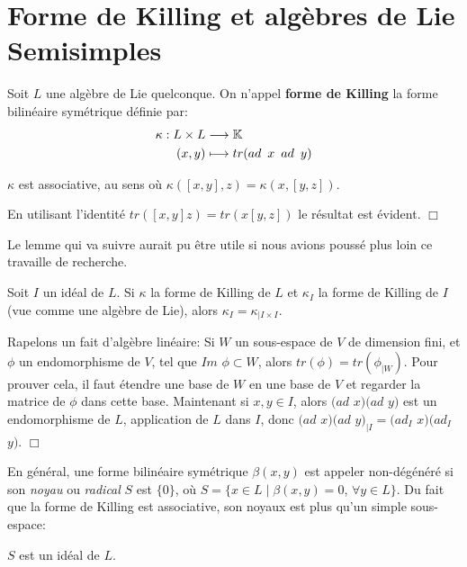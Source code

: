 \documentclass[a4paper,openany,12pt]{report}
\newcommand{\KK}{\mathbb{K}}
\theoremstyle{break}
{\theorembodyfont{\upshape}
\newtheorem*{rmq}{Remarque :}
\newtheorem*{prv}{Preuve :}
\newtheorem*{ex}{Exemples :}
\newtheorem*{exe}{Exemple : }
\newtheorem*{nota}{Notation :}
\newtheorem*{dem}{D\'emonstration :}}
\begin{document}
\chapter{Forme de Killing et algèbres de Lie Semisimples}

\begin{df}
\quad Soit $L$ une algèbre de Lie quelconque. On n'appel \textbf{forme de Killing} la forme bilinéaire symétrique définie par:
\begin{align*}
\kappa : L \times L & \longrightarrow \KK \\
(x,y) & \longmapsto tr(ad \enskip x \enskip ad \enskip y)
\end{align*}
\end{df}

\begin{prop}
\quad $\kappa$ est associative, au sens où $\kappa([x,y],z)=\kappa(x,[y,z])$.
\end{prop}

\begin{prv}
En utilisant l'identité $tr([x,y]z)=tr(x[y,z])$ le résultat est évident. $\Box$
\end{prv}

Le lemme qui va suivre aurait pu être utile si nous avions poussé plus loin ce travaille de recherche. 

\begin{lem}
\quad Soit $I$ un idéal de $L$. Si $\kappa$ la forme de Killing de $L$ et $\kappa_I$ la forme de Killing de $I$ (vue comme une algèbre de Lie), alors $\kappa_I = \kappa_{\mid I \times I}$.
\end{lem}

\begin{prv}
\quad Rapelons un fait d'algèbre linéaire: Si $W$ un sous-espace de $V$ de dimension fini, et $\phi$ un endomorphisme de $V$, tel que $Im$ $\phi \subset W$, alors $tr(\phi) = tr(\phi_{\mid W})$. Pour prouver cela, il faut étendre une base de $W$ en une base de $V$ et regarder la matrice de $\phi$ dans cette base. Maintenant si $x,y \in I$, alors $(ad$ $x)(ad$ $y)$ est un endomorphisme de $L$, application de $L$ dans $I$, donc $(ad$ $x)(ad$ $y)_{\mid I}=(ad_I$ $x)(ad_I$ $y)$. $\Box$
\end{prv}

En général, une forme bilinéaire symétrique $\beta(x,y)$ est appeler non-dégénéré si son \textit{noyau} ou \textit{radical} $S$ est $\{0\}$, où $S = \{ x \in L \mid \beta(x,y)=0$, $\forall y \in L \}$. Du fait que la forme de Killing est associative, son noyaux est plus qu'un simple sous-espace: 
\begin{center}
$S$ est un idéal de $L$. 
\end{center}
\end{document}
